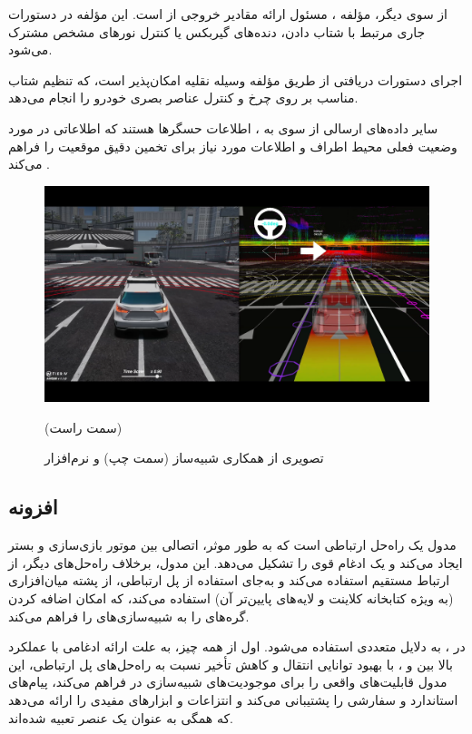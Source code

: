 از سوی دیگر، مؤلفه ، مسئول ارائه مقادیر خروجی از  است. این مؤلفه در دستورات جاری مرتبط با شتاب دادن، دنده‌های گیربکس یا کنترل نورهای مشخص مشترک می‌شود.

اجرای دستورات دریافتی از طریق مؤلفه وسیله نقلیه امکان‌پذیر است، که تنظیم شتاب مناسب بر روی چرخ و کنترل عناصر بصری خودرو را انجام می‌دهد.

سایر داده‌های ارسالی از سوی  به ، اطلاعات حسگرها هستند که اطلاعاتی در مورد وضعیت فعلی محیط اطراف و اطلاعات مورد نیاز برای تخمین دقیق موقعیت  را فراهم می‌کند \cite{AWSIM:Documentation}.

\begin{figure}[h!]
    \centering
    \includegraphics[width=0.95\linewidth]{figures/AWSIM_Autoware_Combination.png}
    \caption{تصویری از همکاری شبیه‌ساز  (سمت چپ) و نرم‌افزار } (سمت راست) \cite{AWSIM:Documentation}
    \label{fig:AWSIM_Autoware_Combination}
\end{figure}

\subsection{افزونه }
مدول  یک راه‌حل ارتباطی است که به طور موثر، اتصالی بین موتور بازی‌سازی  و بستر  ایجاد می‌کند و یک ادغام قوی را تشکیل می‌دهد. این مدول، برخلاف راه‌حل‌های دیگر، از ارتباط مستقیم استفاده می‌کند و به‌جای استفاده از پل ارتباطی، از پشته میان‌افزاری  (به ویژه کتابخانه کلاینت  و لایه‌های پایین‌تر آن) استفاده می‌کند، که امکان اضافه کردن گره‌های  را به شبیه‌سازی‌های  را فراهم می‌کند.

 در ، به دلایل متعددی استفاده می‌شود. اول از همه‌ چیز، به علت ارائه ادغامی با عملکرد بالا بین  و ، با بهبود توانایی انتقال و کاهش تأخیر نسبت به راه‌حل‌های پل ارتباطی، این مدول قابلیت‌های واقعی  را برای موجودیت‌های شبیه‌سازی در  فراهم می‌کند، پیام‌های استاندارد و سفارشی را پشتیبانی می‌کند و انتزاعات و ابزارهای مفیدی را ارائه می‌دهد که همگی به عنوان یک عنصر  تعبیه شده‌اند.

